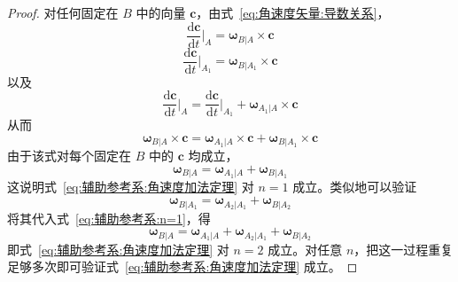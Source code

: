 \begin{proof}
    对任何固定在 $B$ 中的向量 $\mathbf{c}$，由式~\eqref{eq:角速度矢量:导数关系}，
\begin{equation}
    \frac{\mathrm{d}\mathbf{c}}{\mathrm{d}t}\Big|_{A} = \bm{\omega}_{B|A}\times\mathbf{c}
\end{equation}
\begin{equation}
    \frac{\mathrm{d}\mathbf{c}}{\mathrm{d}t}\Big|_{A_1} = \bm{\omega}_{B|A_1}\times\mathbf{c}
\end{equation}
以及
\begin{equation}
    \frac{\mathrm{d}\mathbf{c}}{\mathrm{d}t}\Big|_{A} = \frac{\mathrm{d}\mathbf{c}}{\mathrm{d}t}\Big|_{A_1} + \bm{\omega}_{A_1|A}\times\mathbf{c}
\end{equation}
从而
\begin{equation}
    \bm{\omega}_{B|A}\times\mathbf{c} = \bm{\omega}_{A_1|A}\times\mathbf{c} + \bm{\omega}_{B|A_1}\times\mathbf{c}
\end{equation}
由于该式对每个固定在 $B$ 中的 $\mathbf{c}$ 均成立，
\begin{equation}
    \bm{\omega}_{B|A} = \bm{\omega}_{A_1|A} + \bm{\omega}_{B|A_1}
    \label{eq:辅助参考系:n=1}
\end{equation}
这说明式~\eqref{eq:辅助参考系:角速度加法定理} 对 $n=1$ 成立。类似地可以验证
\begin{equation}
    \bm{\omega}_{B|A_1} = \bm{\omega}_{A_2|A_1} + \bm{\omega}_{B|A_2}
\end{equation}
将其代入式~\eqref{eq:辅助参考系:n=1}，得
\begin{equation}
    \bm{\omega}_{B|A} = \bm{\omega}_{A_1|A} + \bm{\omega}_{A_2|A_1} + \bm{\omega}_{B|A_2}
    \label{eq:辅助参考系:n=2}
\end{equation}
即式~\eqref{eq:辅助参考系:角速度加法定理} 对 $n=2$ 成立。对任意 $n$，把这一过程重复足够多次即可验证式~\eqref{eq:辅助参考系:角速度加法定理} 成立。

\end{proof}

